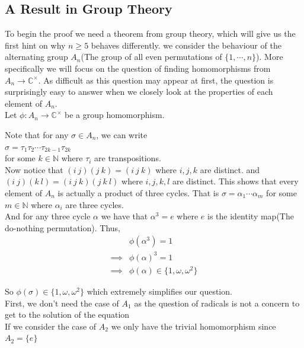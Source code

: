 \documentclass[a4paper,12pt,abstracton]{scrartcl}
\theoremstyle{dotlessP}
\theoremstyle{dotlessS}
\theoremstyle{remark}
\theoremstyle{definition}
\begin{document}
\subsection{A Result in Group Theory}

To begin the proof we need a theorem from group theory, which will give us the first hint on why $n\geq 5$ behaves differently. we consider the behaviour of the alternating group $A_n$(The group of all even permutations of $\{1,\cdots,n\}$). More specifically we will focus on the question of finding homomorphisms from $A_n\rightarrow\mathbb{C}^{\times}$. As difficult as this question may appear at first, the question is surprisingly easy to answer when we closely look at the properties of each element of $A_n$.\\
Let $\phi:A_n\rightarrow\mathbb{C}^{\times}$ be a group homomorphism.

Note that for any $\sigma\in A_n$, we can write \\
$\sigma=\tau_1\tau_2\cdots\tau_{2k-1}\tau_{2k}$ \\
for some $k\in\mathbb{N}$ where $\tau_i$ are transpositions.\\

Now notice that $(i\ j)(j\ k)=(i\ j\ k)$ where $i,j,k$ are distinct. and $(i\ j)(k\ l)=(i\ j\ k)(j\ k\ l)$ where $i,j,k,l$ are distinct. This shows that every element of $A_n$ is actually a product of three cycles. That is $\sigma=\alpha_1\cdots\alpha_m$ for some $m\in\mathbb{N}$ where $\alpha_i$ are three cycles.\\

And for any three cycle $\alpha$ we have that $\alpha^3=e$ where $e$ is the identity map(The do-nothing permutation). Thus,
\begin{align*}
&\phi(\alpha^3)=1\\
\implies&\phi(\alpha)^3=1\\
\implies&\phi(\alpha)\in\{1,\omega,\omega^2\}
\end{align*}

So $\phi(\sigma)\in\{1,\omega,\omega^2\}$ which extremely simplifies our question.\\

First, we don't need the case of $A_1$ as the question of radicals is not a concern to get to the solution of the equation\\

If we consider the case of $A_2$ we only have the trivial homomorphism since $A_2=\{e\}$\\ 
\end{document}
